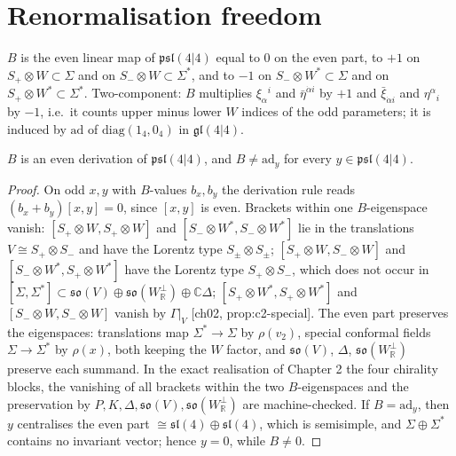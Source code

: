 \section{Renormalisation freedom}

\begin{definition}
\label{def:o-B}
$B$ is the even linear map of $\mathfrak{psl}(4|4)$ equal to $0$ on the even part, to $+1$ on $S_+\otimes W\subset\Sigma$ and on $S_-\otimes W\subset\Sigma^*$, and to $-1$ on $S_-\otimes W^*\subset\Sigma$ and on $S_+\otimes W^*\subset\Sigma^*$. Two-component: $B$ multiplies $\xi_\alpha{}^i$ and $\bar\eta^{\dot\alpha i}$ by $+1$ and $\bar\xi_{\dot\alpha i}$ and $\eta^\alpha{}_i$ by $-1$, i.e.\ it counts upper minus lower $W$ indices of the odd parameters; it is induced by $\mathrm{ad}$ of $\mathrm{diag}(1_4,0_4)$ in $\mathfrak{gl}(4|4)$.
\end{definition}

\begin{lemma}
\label{lem:o-Bouter}
$B$ is an even derivation of $\mathfrak{psl}(4|4)$, and $B\neq\mathrm{ad}_y$ for every $y\in\mathfrak{psl}(4|4)$.
\end{lemma}

\begin{proof}
On odd $x,y$ with $B$-values $b_x,b_y$ the derivation rule reads $(b_x+b_y)[x,y]=0$, since $[x,y]$ is even. Brackets within one $B$-eigenspace vanish: $[S_+\otimes W,S_+\otimes W]$ and $[S_-\otimes W^*,S_-\otimes W^*]$ lie in the translations $V\cong S_+\otimes S_-$ and have the Lorentz type $S_\pm\otimes S_\pm$; $[S_+\otimes W,S_-\otimes W]$ and $[S_-\otimes W^*,S_+\otimes W^*]$ have the Lorentz type $S_+\otimes S_-$, which does not occur in $[\Sigma,\Sigma^*]\subset\mathfrak{so}(V)\oplus\mathfrak{so}(W_{\mathbb R}^\perp)\oplus\mathbb C\Delta$; $[S_+\otimes W^*,S_+\otimes W^*]$ and $[S_-\otimes W,S_-\otimes W]$ vanish by $\Gamma|_V$ [ch02, prop:c2-special]. The even part preserves the eigenspaces: translations map $\Sigma^*\to\Sigma$ by $\rho(v_2)$, special conformal fields $\Sigma\to\Sigma^*$ by $\rho(x)$, both keeping the $W$ factor, and $\mathfrak{so}(V)$, $\Delta$, $\mathfrak{so}(W_{\mathbb R}^\perp)$ preserve each summand. In the exact realisation of Chapter 2 the four chirality blocks, the vanishing of all brackets within the two $B$-eigenspaces and the preservation by $P,K,\Delta,\mathfrak{so}(V),\mathfrak{so}(W_{\mathbb R}^\perp)$ are machine-checked. If $B=\mathrm{ad}_y$, then $y$ centralises the even part $\cong\mathfrak{sl}(4)\oplus\mathfrak{sl}(4)$, which is semisimple, and $\Sigma\oplus\Sigma^*$ contains no invariant vector; hence $y=0$, while $B\neq0$.
\end{proof}

